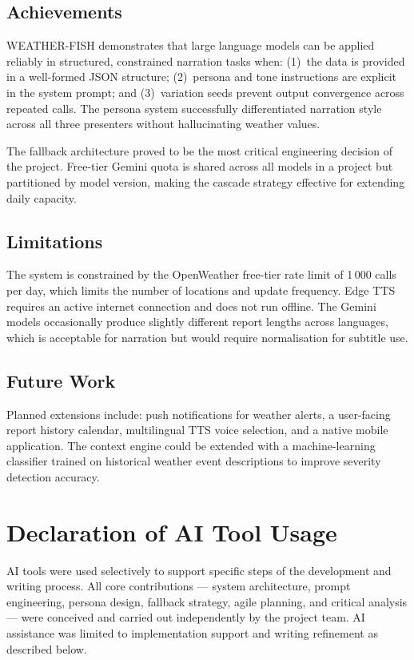 \documentclass[11pt, a4paper]{article}
\begin{document}
\subsection{Achievements}

WEATHER-FISH demonstrates that large language models can be applied reliably in
structured, constrained narration tasks when: (1)~the data is provided in a well-formed
JSON structure; (2)~persona and tone instructions are explicit in the system prompt;
and (3)~variation seeds prevent output convergence across repeated calls. The persona
system successfully differentiated narration style across all three presenters without
hallucinating weather values.

The fallback architecture proved to be the most critical engineering decision of the
project. Free-tier Gemini quota is shared across all models in a project but partitioned
by model version, making the cascade strategy effective for extending daily capacity.

\subsection{Limitations}

The system is constrained by the OpenWeather free-tier rate limit of 1\,000 calls per day,
which limits the number of locations and update frequency. Edge TTS requires an active
internet connection and does not run offline. The Gemini models occasionally produce
slightly different report lengths across languages, which is acceptable for narration but
would require normalisation for subtitle use.

\subsection{Future Work}

Planned extensions include: push notifications for weather alerts, a user-facing
report history calendar, multilingual TTS voice selection, and a native mobile
application. The context engine could be extended with a machine-learning classifier
trained on historical weather event descriptions to improve severity detection accuracy.

\section{Declaration of AI Tool Usage}

AI tools were used selectively to support specific steps of the development and writing
process. All core contributions — system architecture, prompt engineering, persona
design, fallback strategy, agile planning, and critical analysis — were conceived and
carried out independently by the project team. AI assistance was limited to
implementation support and writing refinement as described below.
\end{document}
